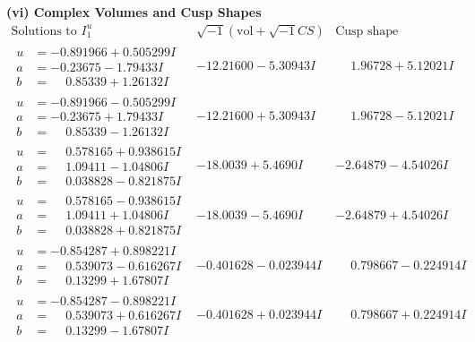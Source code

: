 \documentclass[1p]{elsarticle_modified}
\theoremstyle{definition}
\newcommand{\I}{\sqrt{-1}}
\begin{document}
\newpage\flushleft \textbf{(vi) Complex Volumes and Cusp Shapes}
$$\begin{array}{c|c|c}  
\text{Solutions to }I^u_{1}& \I (\text{vol} + \sqrt{-1}CS) & \text{Cusp shape}\\
 \hline 
\begin{aligned}
u &= -0.891966 + 0.505299 I \\
a &= -0.23675 - 1.79433 I \\
b &= \phantom{-}0.85339 + 1.26132 I\end{aligned}
 & -12.21600 - 5.30943 I & \phantom{-}1.96728 + 5.12021 I \\ \hline\begin{aligned}
u &= -0.891966 - 0.505299 I \\
a &= -0.23675 + 1.79433 I \\
b &= \phantom{-}0.85339 - 1.26132 I\end{aligned}
 & -12.21600 + 5.30943 I & \phantom{-}1.96728 - 5.12021 I \\ \hline\begin{aligned}
u &= \phantom{-}0.578165 + 0.938615 I \\
a &= \phantom{-}1.09411 - 1.04806 I \\
b &= \phantom{-}0.038828 - 0.821875 I\end{aligned}
 & -18.0039 + 5.4690 I & -2.64879 - 4.54026 I \\ \hline\begin{aligned}
u &= \phantom{-}0.578165 - 0.938615 I \\
a &= \phantom{-}1.09411 + 1.04806 I \\
b &= \phantom{-}0.038828 + 0.821875 I\end{aligned}
 & -18.0039 - 5.4690 I & -2.64879 + 4.54026 I \\ \hline\begin{aligned}
u &= -0.854287 + 0.898221 I \\
a &= \phantom{-}0.539073 - 0.616267 I \\
b &= \phantom{-}0.13299 + 1.67807 I\end{aligned}
 & -0.401628 - 0.023944 I & \phantom{-}0.798667 - 0.224914 I \\ \hline\begin{aligned}
u &= -0.854287 - 0.898221 I \\
a &= \phantom{-}0.539073 + 0.616267 I \\
b &= \phantom{-}0.13299 - 1.67807 I\end{aligned}
 & -0.401628 + 0.023944 I & \phantom{-}0.798667 + 0.224914 I \\ \hline\begin{aligned}

\end{aligned}
\end{array}$$
\end{document}
